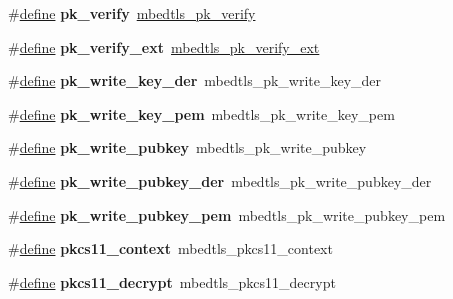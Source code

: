 \begin{DoxyCompactItemize}
\#\hyperlink{structdefine}{define} {\bfseries pk\+\_\+verify}~\hyperlink{pk_8h_abf1939cc1d89f6b9fd341b67d5241914}{mbedtls\+\_\+pk\+\_\+verify}
\item 
\mbox{\label{compat-1_83_8h_ab437028956d8b7da15fada82647e8312}} 
\#\hyperlink{structdefine}{define} {\bfseries pk\+\_\+verify\+\_\+ext}~\hyperlink{pk_8h_a81f0c5e40b839f5eca676c2c2752036f}{mbedtls\+\_\+pk\+\_\+verify\+\_\+ext}
\item 
\mbox{\label{compat-1_83_8h_aa627fd808393eadf3c33f55e804b334e}} 
\#\hyperlink{structdefine}{define} {\bfseries pk\+\_\+write\+\_\+key\+\_\+der}~mbedtls\+\_\+pk\+\_\+write\+\_\+key\+\_\+der
\item 
\mbox{\label{compat-1_83_8h_ab9a31d25f4d486cf8be15998e76c65e5}} 
\#\hyperlink{structdefine}{define} {\bfseries pk\+\_\+write\+\_\+key\+\_\+pem}~mbedtls\+\_\+pk\+\_\+write\+\_\+key\+\_\+pem
\item 
\mbox{\label{compat-1_83_8h_a5460fdb3e10fa44b815fe079617e92ff}} 
\#\hyperlink{structdefine}{define} {\bfseries pk\+\_\+write\+\_\+pubkey}~mbedtls\+\_\+pk\+\_\+write\+\_\+pubkey
\item 
\mbox{\label{compat-1_83_8h_a24e72a964913e931e72ba84fe6f93d64}} 
\#\hyperlink{structdefine}{define} {\bfseries pk\+\_\+write\+\_\+pubkey\+\_\+der}~mbedtls\+\_\+pk\+\_\+write\+\_\+pubkey\+\_\+der
\item 
\mbox{\label{compat-1_83_8h_a8d73e5ca982c50203b3671d4c624bc93}} 
\#\hyperlink{structdefine}{define} {\bfseries pk\+\_\+write\+\_\+pubkey\+\_\+pem}~mbedtls\+\_\+pk\+\_\+write\+\_\+pubkey\+\_\+pem
\item 
\mbox{\label{compat-1_83_8h_a33925791aa604ee0b1ea86397d1b9202}} 
\#\hyperlink{structdefine}{define} {\bfseries pkcs11\+\_\+context}~mbedtls\+\_\+pkcs11\+\_\+context
\item 
\mbox{\label{compat-1_83_8h_a6de067c5cc44e7a08ac8f3ca22e0f204}} 
\#\hyperlink{structdefine}{define} {\bfseries pkcs11\+\_\+decrypt}~mbedtls\+\_\+pkcs11\+\_\+decrypt
\item 
\mbox{\label{compat-1_83_8h_ad6af86b2be65521f4555142a9dd8f7ae}} 

\end{DoxyCompactItemize}
